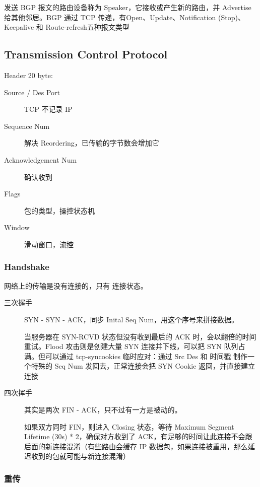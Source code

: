 \documentclass[11pt,journal,compsoc]{IEEEtran}
\begin{document}
发送 BGP 报文的路由设备称为 Speaker，它接收或产生新的路由，并 Advertise 给其他邻居。BGP 通过 TCP 传递，有Open、Update、Notification (Stop)、Keepalive 和 Route-refresh五种报文类型


\subsection{Transmission Control Protocol}

Header 20 byte:

\begin{description}
    \item[Source / Des Port] TCP 不记录 IP

    \item[Sequence Num] 解决 Reordering，已传输的字节数会增加它

    \item[Acknowledgement Num] 确认收到

    \item[Flags] 包的类型，操控状态机

    \item[Window] 滑动窗口，流控
\end{description}


\subsubsection{Handshake}

网络上的传输是没有连接的，只有 连接状态。

\begin{description}
    \item[三次握手] SYN - SYN - ACK，同步 Inital Seq Num，用这个序号来拼接数据。

    当服务器在 SYN-RCVD 状态但没有收到最后的 ACK 时，会以翻倍的时间重试。Flood 攻击则是创建大量 SYN 连接并下线，可以把 SYN 队列占满。但可以通过 tcp-syncookies 临时应对：通过 Src Des 和 时间戳 制作一个特殊的 Seq Num 发回去，正常连接会把 SYN Cookie 返回，并直接建立连接

    \item[四次挥手] 其实是两次 FIN - ACK，只不过有一方是被动的。
    
    如果双方同时 FIN，则进入 Closing 状态，等待 Maximum Segment Lifetime (30s) * 2，确保对方收到了 ACK，有足够的时间让此连接不会跟后面的新连接混淆（有些路由会缓存 IP 数据包，如果连接被重用，那么延迟收到的包就可能与新连接混淆）
\end{description}


\subsubsection{重传}
\end{document}
